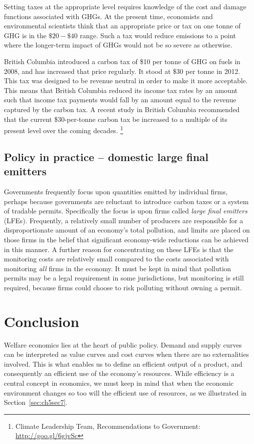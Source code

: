 Setting taxes at the appropriate level requires knowledge of the cost and
damage functions associated with GHGs. At the present time, economists
and environmental scientists think that an appropriate price or tax on one
tonne of GHG is in the $\$20-\$40$ range. Such a tax would reduce emissions
to a point where the longer-term impact of GHGs would not be so severe as
otherwise.

British Columbia introduced a carbon tax of \$10 per tonne of GHG on fuels
in 2008, and has increased that price regularly. It stood at \$30 per tonne
in 2012. This tax was designed to be revenue neutral in order to make it
more acceptable. This means that British Columbia reduced its income tax
rates by an amount such that income tax payments would fall by an amount
equal to the revenue captured by the carbon tax. A recent study in British 
Columbia recommended that the current \$30-per-tonne carbon tax be increased 
to a multiple of its present level over the coming decades.
\footnote{Climate Leadership Team, Recommendations to Government: \url{http://goo.gl/6gjvSc}}

\subsection*{Policy in practice -- domestic large final emitters}

Governments frequently focus upon quantities emitted by individual firms,
perhaps because governments are reluctant to introduce carbon taxes or a
system of tradable permits. Specifically the focus is upon firms called 
\textit{large final emitters} (LFEs). Frequently, a relatively small number
of producers are responsible for a disproportionate amount of an economy's
total pollution, and limits are placed on those firms in the belief that
significant economy-wide reductions can be achieved in this manner. A
further reason for concentrating on these LFEs is that the monitoring costs
are relatively small compared to the costs associated with monitoring 
\textit{all} firms in the economy. It must be kept in mind that pollution
permits may be a legal requirement in some jurisdictions, but monitoring is
still required, because firms could choose to risk polluting without owning
a permit.

\section*{Conclusion}

Welfare economics lies at the heart of public policy. Demand and supply
curves can be interpreted as value curves and cost curves when there are no
externalities involved. This is what enables us to define an efficient
output of a product, and consequently an efficient use of the economy's
resources. While efficiency is a central concept in economics, we must keep
in mind that when the economic environment changes so too will the efficient
use of resources, as we illustrated in Section~\ref{sec:ch5sec7}.


